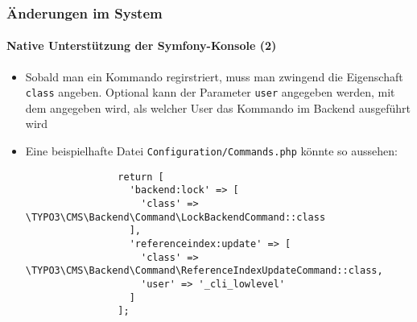 \begin{frame}[fragile]
	\frametitle{Änderungen im System}
	\framesubtitle{Native Unterstützung der Symfony-Konsole (2)}

	\lstset{basicstyle=\tiny\ttfamily}

	\begin{itemize}

		\item Sobald man ein Kommando regirstriert, muss man zwingend die Eigenschaft \texttt{class} angeben.
			Optional kann der Parameter \texttt{user} angegeben werden, mit dem angegeben wird, als welcher User das Kommando im Backend ausgeführt wird

		\item Eine beispielhafte Datei \texttt{Configuration/Commands.php} könnte so aussehen:

			\begin{lstlisting}
				return [
				  'backend:lock' => [
				    'class' => \TYPO3\CMS\Backend\Command\LockBackendCommand::class
				  ],
				  'referenceindex:update' => [
				    'class' => \TYPO3\CMS\Backend\Command\ReferenceIndexUpdateCommand::class,
				    'user' => '_cli_lowlevel'
				  ]
				];
			\end{lstlisting}

	\end{itemize}

\end{frame}

